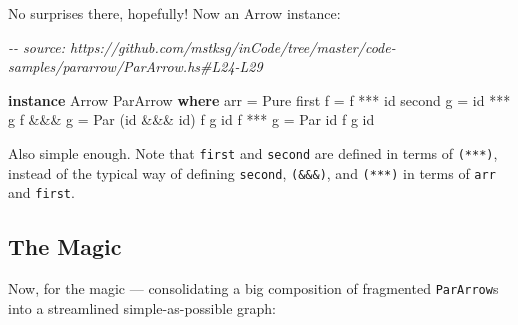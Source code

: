 \documentclass[]{article}
\newenvironment{Shaded}{}{}
\newcommand{\CommentTok}[1]{\textcolor[rgb]{0.38,0.63,0.69}{\textit{#1}}}
\newcommand{\DataTypeTok}[1]{\textcolor[rgb]{0.56,0.13,0.00}{#1}}
\newcommand{\FunctionTok}[1]{\textcolor[rgb]{0.02,0.16,0.49}{#1}}
\newcommand{\KeywordTok}[1]{\textcolor[rgb]{0.00,0.44,0.13}{\textbf{#1}}}
\newcommand{\NormalTok}[1]{#1}
\newcommand{\OperatorTok}[1]{\textcolor[rgb]{0.40,0.40,0.40}{#1}}
\newcommand{\OtherTok}[1]{\textcolor[rgb]{0.00,0.44,0.13}{#1}}
\begin{document}
No surprises there, hopefully! Now an Arrow instance:

\begin{Shaded}
\begin{Highlighting}[]
\CommentTok{{-}{-} source: https://github.com/mstksg/inCode/tree/master/code{-}samples/pararrow/ParArrow.hs\#L24{-}L29}

\KeywordTok{instance} \DataTypeTok{Arrow} \DataTypeTok{ParArrow} \KeywordTok{where}
\NormalTok{    arr      }\OtherTok{=} \DataTypeTok{Pure}
\NormalTok{    first f  }\OtherTok{=}\NormalTok{ f  }\OperatorTok{***} \FunctionTok{id}
\NormalTok{    second g }\OtherTok{=} \FunctionTok{id} \OperatorTok{***}\NormalTok{ g}
\NormalTok{    f }\OperatorTok{\&\&\&}\NormalTok{ g  }\OtherTok{=} \DataTypeTok{Par}\NormalTok{ (}\FunctionTok{id} \OperatorTok{\&\&\&} \FunctionTok{id}\NormalTok{) f g }\FunctionTok{id}
\NormalTok{    f }\OperatorTok{***}\NormalTok{ g  }\OtherTok{=} \DataTypeTok{Par} \FunctionTok{id}\NormalTok{          f g }\FunctionTok{id}
\end{Highlighting}
\end{Shaded}

Also simple enough. Note that \texttt{first} and \texttt{second} are defined in
terms of \texttt{(***)}, instead of the typical way of defining \texttt{second},
\texttt{(\&\&\&)}, and \texttt{(***)} in terms of \texttt{arr} and
\texttt{first}.

\subsection{The Magic}\label{the-magic}

Now, for the magic --- consolidating a big composition of fragmented
\texttt{ParArrow}s into a streamlined simple-as-possible graph:
\end{document}
